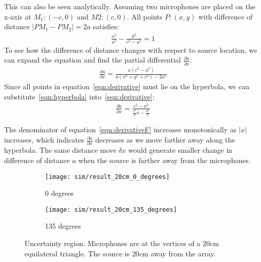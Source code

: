 This can also be seen analytically. Assuming two microphones are placed on the x-axis at $M_1:(-c,0)$ and $M2:(c,0)$. All points $P:(x,y)$ with difference of distance $ |PM_1 - PM_2| = 2a$ satisfies:
\begin{eqnarray}\label{eqn:hyperbola}
\frac{x^2}{a^2} - \frac{y^2}{c^2-a^2} = 1
\end{eqnarray}
To see how the difference of distance changes with respect to source location, we can expand the equation and find the partial differential $\frac{\partial a}{\partial x}$:
\begin{eqnarray}\label{eqn:derivative}
\frac{\partial a}{\partial x} = \frac{x(c^2-a^2)}{a(x^2+y^2+c^2)-2a^3}
\end{eqnarray}
Since all points in equation~\ref{eqn:derivative} must lie on the hyperbola, we can substitute~\ref{eqn:hyperbola} into~\ref{eqn:derivative}:
\begin{eqnarray}\label{eqn:derivativeF}
\frac{\partial a}{\partial x} = \frac{c^2-a^2}{\frac{c^2}{a}x - \frac{a^3}{x}}
\end{eqnarray}

The denominator of equation~\ref{eqn:derivativeF} increases monotonically as $|x|$ increases, which indicates $\frac{\partial a}{\partial x}$ decreases as we move farther away along the hyperbola. The same distance move $\delta x$ would generate smaller change in difference of distance $a$ when the source is farther away from the microphones. 

\begin{figure*}[]
  \centering
  \begin{subfigure}[]{.46\textwidth}
    \texttt{[image: sim/result\_20cm\_0\_degrees]}
    \caption{0 degrees}
  \end{subfigure}
  \begin{subfigure}[]{.46\textwidth}
    \texttt{[image: sim/result\_20cm\_135\_degrees]}
    \caption{135 degrees}
  \end{subfigure}
  \caption{Uncertainty region. Microphones are at the vertices of a $20$cm equilateral triangle. The source is $20$cm away from the array.}
  \label{fig:sim_3_2}
\end{figure*}

